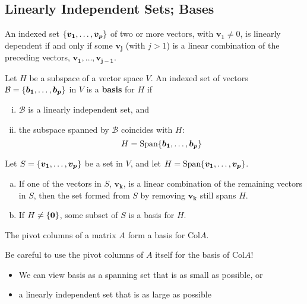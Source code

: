 \documentclass[11pt]{scrartcl}
\theoremstyle{dotlessP}
\theoremstyle{dotlessN}
\DeclarePairedDelimiter\set{\{}{\}}
\newcommand{\col}{\text{Col}}
\newcommand{\spa}[1]{\text{Span}\set*{#1}}
\newcommand{\basis}{\mathcal{B}}
\begin{document}
\subsection{Linearly Independent Sets; Bases}
\begin{theorem}
	An indexed set $\set*{\bm{v_1},\dots,\bm{v_p}}$ of two or more vectors, with $\bm{v_1} \neq 0$, is linearly dependent if and only if some $\bm{v_j}$ (with $j > 1$) is a linear combination of the preceding vectors, $\bm{v_1},\dots,\bm{v_{j-1}}$.
\end{theorem}
\begin{definition}
	Let $H$ be a subspace of a vector space $V$. An indexed set of vectors $\basis = \set*{\bm{b_1}, \dots, \bm{b_p}}$ in $V$ is a \textbf{basis} for $H$ if
	\begin{enumerate}[(i)]
		\item $\basis$ is a linearly independent set, and
		\item the subspace spanned by $\basis$ coincides with  $H$:
			\[
				H = \spa{\bm{b_1}, \dots, \bm{b_p}}
			\] 
	\end{enumerate}
\end{definition}
\begin{theorem}
	Let $S = \set*{\bm{v_1},\dots,\bm{v_p}}$ be a set in $V$, and let $H = \spa{\bm{v_1},\dots,\bm{v_p}}$.
	\begin{enumerate}[a.]
		\item If one of the vectors in $S$, $\bm{v_k}$, is a linear combination of the remaining vectors in $S$, then the set formed from $S$ by removing $\bm{v_k}$ still spans $H$.
		\item If $H \neq \set*{\bm{0}}$, some subset of $S$ is a basis for $H$.
	\end{enumerate}
\end{theorem}
\begin{theorem}
	The pivot columns of a matrix $A$ form a basis for $\col A$.
\end{theorem}
\begin{remark}
	Be careful to use the pivot columns of $A$ itself for the basis of $\col A$!
\end{remark}
\begin{itemize}
	\item We can view basis as a spanning set that is as small as possible, or
	\item a linearly independent set that is as large as possible
\end{itemize}
\end{document}
